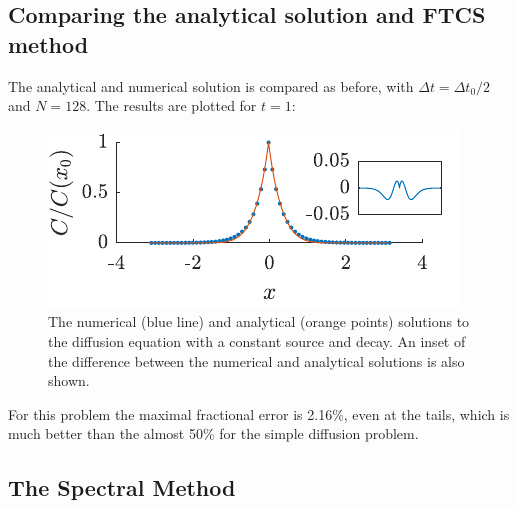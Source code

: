 \documentclass[a4paper,10pt]{article} 	%
\numberwithin{equation}{section}
\begin{document}
	\subsection{Comparing the analytical solution and FTCS method}
	The analytical and numerical solution is compared as before, with $ \Delta t = \Delta t_0/2 $ and $ N=128 $. The results are plotted for $ t = 1 $:
	\begin{figure}[H]
		\centering
		\includegraphics[width = 0.5\linewidth]{diffSource.pdf}
		\caption{The numerical (blue line) and analytical (orange points) solutions to the diffusion equation with a constant source and decay. An inset of the difference between the numerical and analytical solutions is also shown.}
		\label{fig:diffSource}
	\end{figure}
	For this problem the maximal fractional error is 2.16\%, even at the tails, which is much better than the almost 50\% for the simple diffusion problem.
	
	\subsection{The Spectral Method}
\end{document}
